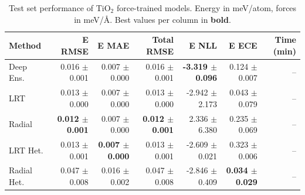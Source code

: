 \begin{table}
\centering
\caption{Test set performance of TiO$_2$ force-trained models. Energy in meV/atom, forces in meV/\AA{}. Best values per column in \textbf{bold}.}
\label{tab:tio2_results}
\begin{tabular}{lrrrrrr}
\toprule
Method & E RMSE & E MAE & Total RMSE & E NLL & E ECE & Time (min) \\
\midrule
Deep Ens. & 0.016 $\pm$ 0.001 & 0.007 $\pm$ 0.000 & 0.016 $\pm$ 0.001 & \textbf{-3.319 $\pm$ 0.096} & 0.124 $\pm$ 0.007 & -- \\
LRT & 0.013 $\pm$ 0.000 & 0.007 $\pm$ 0.000 & 0.013 $\pm$ 0.000 & -2.942 $\pm$ 2.173 & 0.043 $\pm$ 0.079 & -- \\
Radial & \textbf{0.012 $\pm$ 0.001} & 0.007 $\pm$ 0.000 & \textbf{0.012 $\pm$ 0.001} & 2.336 $\pm$ 6.380 & 0.235 $\pm$ 0.069 & -- \\
LRT Het. & 0.013 $\pm$ 0.001 & \textbf{0.007 $\pm$ 0.000} & 0.013 $\pm$ 0.001 & -2.609 $\pm$ 0.021 & 0.323 $\pm$ 0.006 & -- \\
Radial Het. & 0.047 $\pm$ 0.008 & 0.016 $\pm$ 0.002 & 0.047 $\pm$ 0.008 & -2.846 $\pm$ 0.409 & \textbf{0.034 $\pm$ 0.029} & -- \\
\bottomrule
\end{tabular}
\end{table}